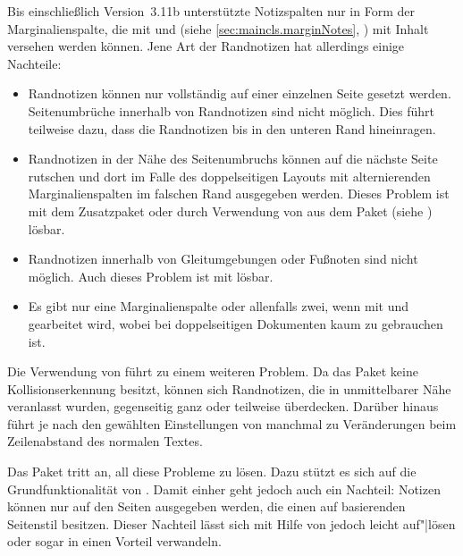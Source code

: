 \BeginIndexGroup
{}%
Bis einschließlich Version~3.11b unterstützte \KOMAScript{} Notizspalten nur
in Form der Marginalienspalte, die mit  und
 (siehe \autoref{sec:maincls.marginNotes},
) mit Inhalt versehen werden
können. Jene Art der Randnotizen hat allerdings einige Nachteile:
\begin{itemize}
\item Randnotizen können nur vollständig auf einer einzelnen Seite gesetzt
  werden. Seitenumbrüche innerhalb von Randnotizen
  sind nicht möglich. Dies führt teilweise dazu, dass die Randnotizen bis in
  den unteren Rand hineinragen.
\item Randnotizen in der Nähe des Seitenumbruchs können auf die nächste Seite
  rutschen und dort im Falle des doppelseitigen Layouts mit alternierenden
  Marginalienspalten im falschen Rand
  ausgegeben werden. Dieses Problem ist mit dem Zusatzpaket
   oder durch Verwendung von
   aus dem Paket
   (siehe
  \cite{package:marginnote}) lösbar.
\item Randnotizen innerhalb von Gleitumgebungen oder
  Fußnoten sind nicht möglich. Auch dieses Problem ist mit
   lösbar.
\item Es gibt nur eine Marginalienspalte oder
  allenfalls zwei, wenn mit  und
   gearbeitet wird, wobei  bei
  doppelseitigen Dokumenten kaum zu gebrauchen ist.
\end{itemize}
Die Verwendung von  führt zu
einem weiteren Problem. Da das Paket keine Kollisionserkennung besitzt, können
sich Randnotizen, die in unmittelbarer Nähe veranlasst wurden, gegenseitig
ganz oder teilweise überdecken. Darüber hinaus führt  je
nach den gewählten Einstellungen von  manchmal zu
Veränderungen beim Zeilenabstand des normalen Textes.

Das Paket  tritt an, all diese Probleme zu
lösen. Dazu stützt es sich auf die Grundfunktionalität von
\hyperref[cha:scrlayer]{}%
. Damit einher geht
jedoch auch ein Nachteil: Notizen können nur auf den Seiten
ausgegeben werden, die einen auf \hyperref[cha:scrlayer]{}
basierenden Seitenstil besitzen. Dieser Nachteil lässt sich mit Hilfe von
\hyperref[cha:scrlayer-scrpage]{}%
%
 jedoch leicht
auf"|lösen oder sogar in einen Vorteil verwandeln.


